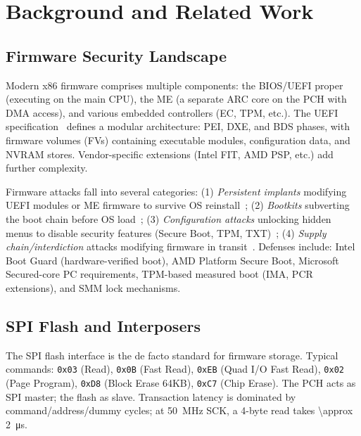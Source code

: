 \section{Background and Related Work}
\label{sec:background}

\subsection{Firmware Security Landscape}
Modern x86 firmware comprises multiple components: the \ac{BIOS}/\ac{UEFI} proper (executing on the main CPU), the \ac{ME} (a separate ARC core on the \ac{PCH} with DMA access), and various embedded controllers (\ac{EC}, \ac{TPM}, etc.). The \ac{UEFI} specification~\cite{uefi-spec} defines a modular architecture: \ac{PEI}, \ac{DXE}, and \ac{BDS} phases, with firmware volumes (FVs) containing executable modules, configuration data, and \ac{NVRAM} stores. Vendor-specific extensions (Intel FIT, AMD PSP, etc.) add further complexity.

Firmware attacks fall into several categories: (1) \textit{Persistent implants} modifying \ac{UEFI} modules or \ac{ME} firmware to survive OS reinstall~\cite{kallenberg2015firmware, wormley2018bios,チェリュ2020moonbounce}; (2) \textit{Bootkits} subverting the boot chain before OS load~\cite{rutkowska2008evil}; (3) \textit{Configuration attacks} unlocking hidden menus to disable security features (Secure Boot, \ac{TPM}, \ac{TXT})~\cite{coreboot, insyde-unlock}; (4) \textit{Supply chain/interdiction} attacks modifying firmware in transit~\cite{nsa-ant}. Defenses include: Intel Boot Guard (hardware-verified boot), AMD Platform Secure Boot, Microsoft Secured-core PC requirements, \ac{TPM}-based measured boot (\ac{IMA}, \ac{PCR} extensions), and \ac{SMM} lock mechanisms.

\subsection{SPI Flash and Interposers}
The \ac{SPI} flash interface is the de facto standard for firmware storage. Typical commands: \texttt{0x03} (Read), \texttt{0x0B} (Fast Read), \texttt{0xEB} (Quad I/O Fast Read), \texttt{0x02} (Page Program), \texttt{0xD8} (Block Erase 64KB), \texttt{0xC7} (Chip Erase). The \ac{PCH} acts as \ac{SPI} master; the flash as slave. Transaction latency is dominated by command/address/dummy cycles; at \SI{50}{MHz} SCK, a 4-byte read takes \SI{\approx 2}{\micro s}.

